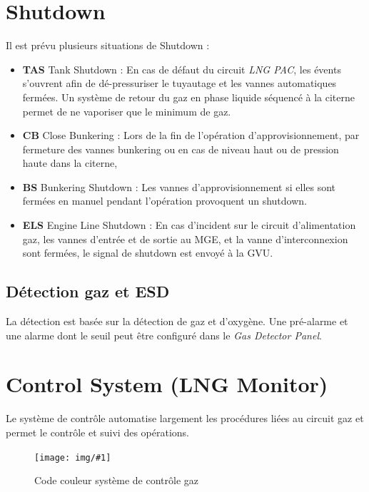 \documentclass[12pt,a4paper]{article}
\newcommand{\image}[3]
 {\begin{figure}[H]
         \begin{center}
          \texttt{[image: img/\#1]}
          \caption{#2} \label{img_#1}
         \end{center}
  \end{figure}
}
\begin{document}
\section{Shutdown}

Il est prévu plusieurs situations de Shutdown :
\begin{itemize}
 \item \textbf{TAS} Tank Shutdown : En cas de défaut du circuit \emph{LNG PAC}, les évents s'ouvrent afin de dé-pressuriser le tuyautage et les vannes automatiques fermées. Un système de retour du gaz en phase liquide séquencé à la citerne permet de ne vaporiser que le minimum de gaz.  
 \item \textbf{CB} Close Bunkering : Lors de la fin de l'opération d'approvisionnement, par fermeture des vannes bunkering ou en cas de niveau haut ou de pression haute dans la citerne, 
 \item \textbf{BS} Bunkering Shutdown : Les vannes d'approvisionnement si elles sont fermées en manuel pendant l'opération provoquent un shutdown.
 \item \textbf{ELS} Engine Line Shutdown : En cas d'incident sur le circuit d'alimentation gaz, les vannes d'entrée et de sortie au MGE, et la vanne d'interconnexion sont fermées, le signal de shutdown est envoyé à la GVU.
 
\end{itemize}

%
%
\subsection{Détection gaz et ESD}

La détection est basée sur la détection de gaz et d'oxygène. Une pré-alarme et une alarme dont le seuil peut être configuré dans le \emph{Gas Detector Panel}. 


\section{ Control System (LNG Monitor)
}

Le système de contrôle automatise largement les procédures liées au circuit gaz et permet le contrôle et suivi des opérations.

\image{ControlSystem}{Code couleur système de contrôle gaz}{}
\end{document}
